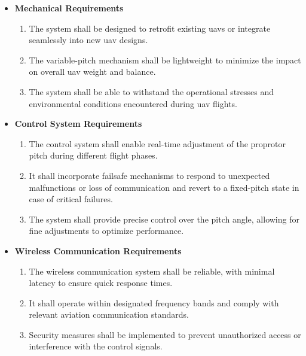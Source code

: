\begin{itemize}
    \item \textbf{Mechanical Requirements}
          \begin{enumerate}[start=1,label={\upshape(\bfseries REQ\_0\arabic*):},wide = 0pt, leftmargin = 3em]
              \item The system shall be designed to retrofit existing \glspl{uav} or integrate seamlessly into new \gls{uav} designs.
              \item The variable-pitch mechanism shall be lightweight to minimize the impact on overall \gls{uav} weight and balance.
              \item The system shall be able to withstand the operational stresses and environmental conditions encountered during \gls{uav} flights.
          \end{enumerate}

    \item \textbf{Control System Requirements}
          \begin{enumerate}[start=04,label={(\bfseries REQ\_0\arabic*):},wide = 0pt, leftmargin = 3em]
              \item The control system shall enable real-time adjustment of the proprotor pitch during different flight phases.
              \item It shall incorporate failsafe mechanisms to respond to unexpected malfunctions or loss of communication and revert to a fixed-pitch state in case of critical failures.
              \item The system shall provide precise control over the pitch angle, allowing for fine adjustments to optimize performance.
          \end{enumerate}

    \item \textbf{Wireless Communication Requirements}
          \begin{enumerate}[start=07,label={(\bfseries REQ\_0\arabic*):},wide = 0pt, leftmargin = 3em]
              \item The wireless communication system shall be reliable, with minimal latency to ensure quick response times.
              \item It shall operate within designated frequency bands and comply with relevant aviation communication standards.
              \item Security measures shall be implemented to prevent unauthorized access or interference with the control signals.
          \end{enumerate}


\end{itemize}

